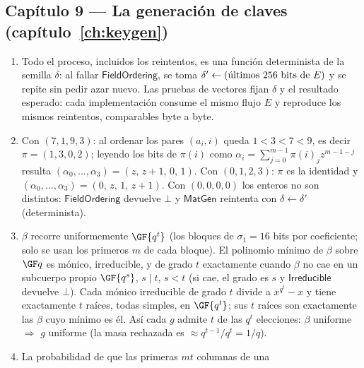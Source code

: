 
\subsection*{Capítulo 9 --- La generación de claves
(capítulo~\ref{ch:keygen})}

\begin{enumerate}[leftmargin=1.9em,itemsep=4pt]
  \item Todo el proceso, incluidos los reintentos, es una función
        determinista de la semilla $\delta$: al fallar
        $\textsf{FieldOrdering}$, se toma $\delta'\leftarrow
        \textnormal{(últimos $256$ bits de }E)$ y se repite sin pedir
        azar nuevo. Las pruebas de vectores fijan $\delta$ y el
        resultado esperado: cada implementación consume el mismo flujo
        $E$ y reproduce los mismos reintentos, comparables byte a
        byte.
  \item Con $(7,1,9,3)$: al ordenar los pares $(a_i,i)$ queda
        $1<3<7<9$, es decir $\pi=(1,3,0,2)$; leyendo los bits de
        $\pi(i)$ como $\alpha_i=\sum_{j=0}^{m-1}\pi(i)_jz^{m-1-j}$
        resulta $(\alpha_0,\dots,\alpha_3)=(z,\,z+1,\,0,\,1)$. Con
        $(0,1,2,3)$: $\pi$ es la identidad
        y $(\alpha_0,\dots,\alpha_3)=(0,\,z,\,1,\,z+1)$. Con
        $(0,0,0,0)$ los enteros no son distintos:
        $\textsf{FieldOrdering}$ devuelve $\bot$ y
        $\textsf{MatGen}$ reintenta con $\delta\leftarrow\delta'$
        (determinista).
  \item $\beta$ recorre uniformemente $\GF{q^t}$ (los bloques de
        $\sigma_1=16$ bits por coeficiente; solo se usan los primeros
        $m$ de cada bloque). El polinomio mínimo de $\beta$ sobre
        $\GF q$ es mónico, irreducible, y de grado $t$ exactamente
        cuando $\beta$ no cae en un subcuerpo propio
        $\GF{q^s}$, $s\mid t$, $s<t$ (si cae, el grado es $s$ y
        $\textsf{Irreducible}$ devuelve $\bot$). Cada mónico
        irreducible de grado $t$ divide a $x^{q^t}-x$ y tiene
        exactamente $t$ raíces, todas simples, en $\GF{q^t}$; sus
        $t$ raíces son exactamente las $\beta$ cuyo mínimo es él. Así
        cada $g$ admite $t$ de las $q^t$ elecciones: $\beta$
        uniforme $\Rightarrow$ $g$ uniforme (la masa rechazada es
        $\approx q^{t-1}/q^t=1/q$).
  \item La probabilidad de que las primeras $mt$ columnas de una

\end{enumerate}
